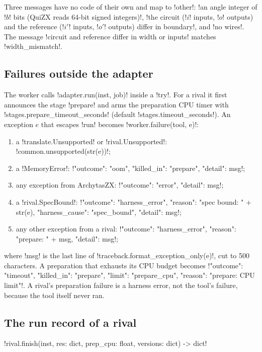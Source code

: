Three messages have no code of their own and map to \code!other!: \code!an angle integer of !$b$\code! bits (QuiZX reads 64-bit signed integers)!, \code!the circuit (!$i$\code! inputs, !$o$\code! outputs) and the reference (!$i'$\code! inputs, !$o'$\code! outputs) differ in boundary!, and \code!no wires!. The message \code!circuit and reference differ in width or inputs! matches \code!width_mismatch!.

\subsection{Failures outside the adapter}\label{sec:bench-tools-failures}

The worker calls \py!adapter.run(inst, job)! inside a \code!try!. For a rival it first announces the stage \code!prepare! and arms the preparation CPU timer with \code!stages.prepare_timeout_seconds! (default \code!stages.timeout_seconds!). An exception $e$ that escapes \py!run! becomes \py!worker.failure(tool, e)!:
\begin{enumerate}
\item a \py!translate.Unsupported! or \py!rival.Unsupported!: \py!common.unsupported(str(e))!;
\item a \py!MemoryError!: \py!{"outcome": "oom", "killed_in": "prepare", "detail": msg}!;
\item any exception from ArchytasZX: \py!{"outcome": "error", "detail": msg}!;
\item a \py!rival.SpecBound!: \py!{"outcome": "harness_error", "reason": "spec bound: " + str(e), "harness_cause": "spec_bound", "detail": msg}!;
\item any other exception from a rival: \py!{"outcome": "harness_error", "reason": "prepare: " + msg, "detail": msg}!;
\end{enumerate}
where \py!msg! is the last line of \py!traceback.format_exception_only(e)!, cut to 500 characters. A preparation that exhausts its CPU budget becomes \py!{"outcome": "timeout", "killed_in": "prepare", "limit": "prepare_cpu", "reason": "prepare: CPU limit"}!. A rival's preparation failure is a harness error, not the tool's failure, because the tool itself never ran.

\subsection{The run record of a rival}\label{sec:bench-tools-record}

\begin{signature}
\py!rival.finish(inst, res: dict, prep_cpu: float, versions: dict) -> dict!
\end{signature}

